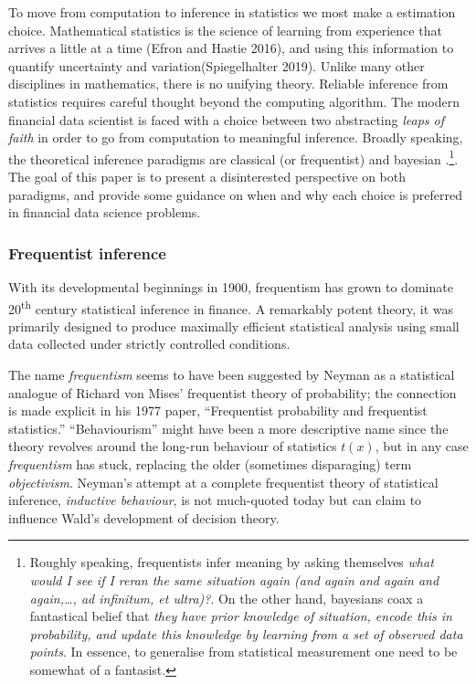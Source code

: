 \documentclass{article}
\begin{document}
To move from computation to inference in statistics we most make a
estimation choice. Mathematical statistics is the science of learning
from experience that arrives a little at a time (Efron and Hastie 2016),
and using this information to quantify uncertainty and
variation(Spiegelhalter 2019). Unlike many other disciplines in
mathematics, there is no unifying theory. Reliable inference from
statistics requires careful thought beyond the computing algorithm. The
modern financial data scientist is faced with a choice between two
abstracting \emph{leaps of faith} in order to go from computation to
meaningful inference. Broadly speaking, the theoretical inference
paradigms are classical (or frequentist) and bayesian .\footnote{Roughly
  speaking, frequentists infer meaning by asking themselves \emph{what
  would I see if I reran the same situation again (and again and again
  and again,\ldots, ad infinitum, et ultra)?}. On the other hand,
  bayesians coax a fantastical belief that \emph{they have prior
  knowledge of situation, encode this in probability, and update this
  knowledge by learning from a set of observed data points}. In essence,
  to generalise from statistical measurement one need to be somewhat of
  a fantasist.}. The goal of this paper is to present a disinterested
perspective on both paradigms, and provide some guidance on when and why
each choice is preferred in financial data science problems.

\hypertarget{frequentist-inference}{%
\subsubsection{Frequentist inference}\label{frequentist-inference}}

With its developmental beginnings in 1900, frequentism has grown to
dominate 20\textsuperscript{th} century statistical inference in
finance. A remarkably potent theory, it was primarily designed to
produce maximally efficient statistical analysis using small data
collected under strictly controlled conditions.

The name \emph{frequentism} seems to have been suggested by Neyman as a
statistical analogue of Richard von Mises' frequentist theory of
probability; the connection is made explicit in his 1977 paper,
``Frequentist probability and frequentist statistics.'' ``Behaviourism''
might have been a more descriptive name since the theory revolves around
the long-run behaviour of statistics \(t(x)\), but in any case
\emph{frequentism} has stuck, replacing the older (sometimes
disparaging) term \emph{objectivism}. Neyman's attempt at a complete
frequentist theory of statistical inference, \emph{inductive behaviour},
is not much-quoted today but can claim to influence Wald's development
of decision theory.
\end{document}

